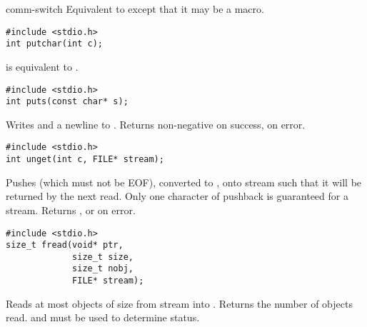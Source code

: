 \begin{Ventry2}{comm-switch  }
     Equivalent to  except that it may be a macro.

\item[putchar]
\label{item:putchar}
\begin{production}
\begin{verbatim}
#include <stdio.h>
int putchar(int c);
\end{verbatim}
\end{production}

      is equivalent to .

\item[puts]
\label{item:puts}
\begin{production}
\begin{verbatim}
#include <stdio.h>
int puts(const char* s);
\end{verbatim}
\end{production}

     Writes  and a newline to . Returns non-negative on success,  on
     error.

\item[unget]
\label{item:unget}
\begin{production}
\begin{verbatim}
#include <stdio.h>
int unget(int c, FILE* stream);
\end{verbatim}
\end{production}

     Pushes  (which must not be EOF), converted to , onto stream  such that it will be returned by the
     next read. Only one character of pushback is guaranteed for a
     stream. Returns , or  on error.

\item[fread]
\label{item:fread}
\begin{production}
\begin{verbatim}
#include <stdio.h>
size_t fread(void* ptr, 
             size_t size, 
             size_t nobj, 
             FILE* stream);
\end{verbatim}
\end{production}

     Reads at most  objects of size  from stream
      into .  Returns the number of objects
     read.  and  must be used to determine status.


\end{Ventry2}

